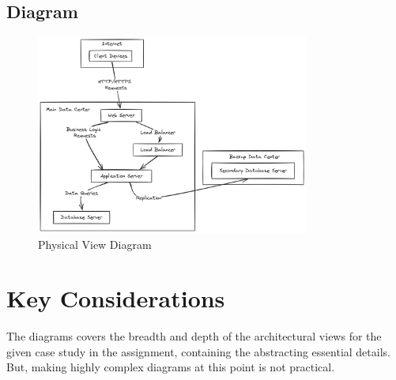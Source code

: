\documentclass[12pt]{article}
\begin{document}
\subsection*{Diagram}
\begin{figure}[h!]
\centering
\includegraphics[width=0.8\textwidth]{physical.png}
\caption{Physical View Diagram}
\end{figure}



\newpage


\section*{Key Considerations}
The diagrams covers the breadth and depth of the architectural views for the given case study in the assignment, containing the abstracting essential details. But, making highly complex diagrams at this point is not practical.

\noindent\hrulefill
\end{document}
